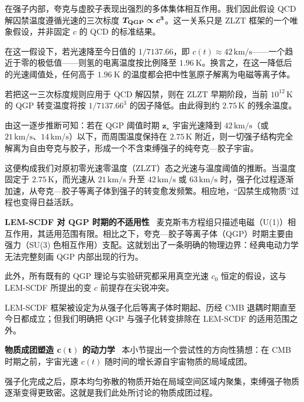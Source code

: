 \documentclass[12pt,leqno]{article}
\begin{document}
	\medskip
	在强子内部，夸克与虚胶子表现出强烈的多体集体相互作用。我们因此假设 QCD 解囚禁温度遵循光速的三次标度 $\boldsymbol{T_{\rm QGP} \propto c^3}$。这一关系只是 ZLZT 框架的一个唯象假设，并非固定 $c$ 的 QCD 的标准结果。
	
	\medskip
	在这一假设下，若光速降至今日值的 $1/7137.66$，即 $c(t) \approx 42\,\mathrm{km/s}$——一个趋近于零的极低值——则氢的电离温度按比例降至 $1.96\ \mathrm{K}$。换言之，在这一降低后的光速阈值处，任何高于 $1.96\ \mathrm{K}$ 的温度都会把中性氢原子解离为电磁等离子体。
	
	\medskip
	若把这一三次标度规则应用于 QCD 解囚禁，则在 ZLZT 早期阶段，当前 $10^{12}\,\mathrm{K}$ 的 QGP 转变温度将按 $1/7137.66^3$ 的因子降低。由此得到约 $2.75\,\mathrm{K}$ 的残余温度。 
	
	\medskip
	由这一逐步推断可知：若在 QGP 阈值时期 $\boldsymbol{z_{\star}}$ 宇宙光速降到 $42\,\mathrm{km/s}$（或 $21\,\mathrm{km/s}$、$14\,\mathrm{km/s}$）以下，而周围温度保持在 $2.75\,\mathrm{K}$ 附近，则一切强子结构完全解离为自由夸克与胶子，形成一个不含束缚强子的纯夸克—胶子宇宙。 
	
	\medskip
	这便构成我们对原初零光速零温度（ZLZT）态之光速与温度阈值的推断。当温度固定于 $2.75\,\mathrm{K}$，而光速从 $21\,\mathrm{km/s}$ 升至 $42\,\mathrm{km/s}$ 或 $63\,\mathrm{km/s}$ 时，强子化过程逐渐加速，从夸克—胶子等离子体到强子的转变愈发频繁。相应地，“囚禁生成物质”过程也变得日益活跃。
	
	
	
	\medskip
	\bigskip
	\textbf{LEM-SCDF 对 QGP 时期的不适用性}\,\,\,
	麦克斯韦方程组只描述电磁（U(1)）相互作用，其适用范围有限。相比之下，夸克—胶子等离子体（QGP）时期主要由强力（SU(3) 色相互作用）支配。这就划出了一条明确的物理边界：经典电动力学无法完整刻画 QGP 内部出现的行为。
	
	\medskip
	此外，所有既有的 QGP 理论与实验研究都采用真空光速 $c_0$ 恒定的假设，这与 LEM-SCDF 所提出的变 $c$ 前提存在尖锐冲突。 
	
	\medskip
	LEM-SCDF 框架被设定为从强子化后等离子体时期起、历经 CMB 退耦时期直至今日都成立；但我们明确把 QGP 与强子化转变排除在 LEM-SCDF 的适用范围之外。
	
	
	
	\medskip
	\bigskip
	\textbf{物质成团塑造 $\boldsymbol{c(t)}$ 的动力学}\,\,\,
	本小节提出一个尝试性的方向性猜想：在 CMB 时期之前，宇宙光速 $c(t)$ 随时间的增长源自宇宙物质的局域成团。
	
	\medskip
	强子化完成之后，原本均匀弥散的物质开始在局域空间区域内聚集，束缚强子物质逐渐变得更致密。这就是我们此处所讨论的物质成团过程。
	
\end{document}
